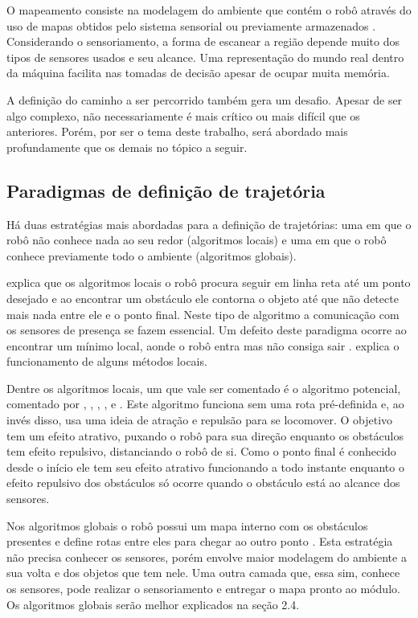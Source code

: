 O mapeamento consiste na modelagem do ambiente que contém o robô através do uso de mapas obtidos pelo sistema sensorial ou previamente armazenados \cite{Souza2008}. Considerando o sensoriamento, a forma de escanear a região depende muito dos tipos de sensores usados e seu alcance. Uma representação do mundo real dentro da máquina facilita nas tomadas de decisão apesar de ocupar muita memória.

A definição do caminho a ser percorrido também gera um desafio. Apesar de ser algo complexo, não necessariamente é mais crítico ou mais difícil que os anteriores. Porém, por ser o tema deste trabalho, será abordado mais profundamente que os demais no tópico a seguir.

\subsection{Paradigmas de definição de trajetória}

Há duas estratégias mais abordadas para a definição de trajetórias: uma em que o robô não conhece nada ao seu redor (algoritmos locais) e uma em que o robô conhece previamente todo o ambiente (algoritmos globais).

\cite{Guzman2008} explica que os algoritmos locais o robô procura seguir em linha reta até um ponto desejado e ao encontrar um obstáculo ele contorna o objeto até que não detecte mais nada entre ele e o ponto final. Neste tipo de algoritmo a comunicação com os sensores de presença se fazem essencial. Um defeito deste paradigma ocorre ao encontrar um mínimo local, aonde o robô entra mas não consiga sair \cite{Souza2008}. \cite{Secchi2008} explica o funcionamento de alguns métodos locais. 

Dentre os algoritmos locais, um que vale ser comentado é o algoritmo potencial, comentado por \cite{Secchi2008}, \cite{Souza2008}, \cite{Guzman2008}, \cite{Choset2005}, \cite{Siegwart2004} e \cite{Thomsen2010}. Este algoritmo funciona sem uma rota pré-definida e, ao invés disso, usa uma ideia de atração e repulsão para se locomover. O objetivo tem um efeito atrativo, puxando o robô para sua direção enquanto os obstáculos tem efeito repulsivo, distanciando o robô de si. Como o ponto final é conhecido desde o início ele tem seu efeito atrativo funcionando a todo instante enquanto o efeito repulsivo dos obstáculos só ocorre quando o obstáculo está ao alcance dos sensores.

Nos algoritmos globais o robô possui um mapa interno com os obstáculos presentes e define rotas entre eles para chegar ao outro ponto \cite{Guzman2008} \cite{Souza2008}. Esta estratégia não precisa conhecer os sensores, porém envolve maior modelagem do ambiente a sua volta e dos objetos que tem nele. Uma outra camada que, essa sim, conhece os sensores, pode realizar o sensoriamento e entregar o mapa pronto ao módulo. Os algoritmos globais serão melhor explicados na seção 2.4.

